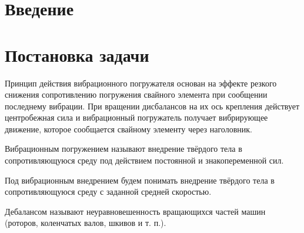 \renewcommand\contentsname{Оглавление} %
\tableofcontents
\setcounter{page}{2}

\pagebreak
\section*{Введение}


\clearpage
\section{Постановка задачи}

Принцип действия вибрационного погружателя основан на эффекте резкого снижения сопротивлению погружения свайного элемента при сообщении последнему вибрации. При вращении дисбалансов на их ось крепления действует центробежная сила и вибрационный погружатель получает вибрирующее движение, которое сообщается свайному элементу через наголовник.

\begin{definition}
    Вибрационным погружением называют внедрение твёрдого тела в сопротивляющуюся среду под действием постоянной и знакопеременной сил.
\end{definition}

\begin{definition}
    Под вибрационным внедрением будем понимать внедрение твёрдого тела в сопротивляющуюся среду с заданной средней скоростью.
\end{definition}

\begin{definition}
    Дебалансом называют неуравновешенность вращающихся частей машин (роторов, коленчатых валов, шкивов и т. п.).
\end{definition}

